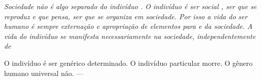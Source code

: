 \documentclass[12pt]{article}
\begin{document}
\em Sociedade \em não é algo separado do \em indivíduo \em.
O indivíduo é \em ser social \em, ser que se reproduz e que pensa, ser que se organiza em sociedade.
Por isso a vida do ser humano é sempre externação e apropriação de elementos para e da sociedade.
A vida do indivíduo se manifesta necessariamente na sociedade, independentemente de 

O indivíduo é ser genérico determinado. O indivíduo particular morre. O gênero humano universal não.
---
\end{document}
